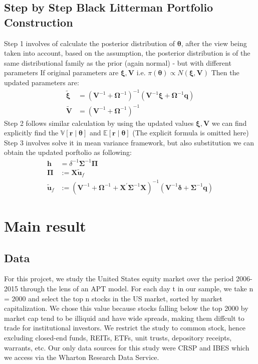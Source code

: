 \documentclass[12pt]{article}
\numberwithin{equation}{section}
\begin{document}
\subsection{Step by Step Black Litterman Portfolio Construction}
\indent
Step 1 involves of calculate the posterior distribution of $\boldsymbol{\theta}$, after the view being taken into account, based on the assumption, the posterior distribution is of the same distributional family as the prior (again normal) - but with different parameters
If original parameters are $\boldsymbol{\xi}, \textbf{V}$ i.e. $\pi(\boldsymbol{\theta}) \propto N(\boldsymbol{\xi},\textbf{V})$
Then the updated parameters are:
\begin{align} 
\tilde{{\boldsymbol{\xi}}} &= (\textbf{V}^{-1} + \boldsymbol{\Omega}^{-1})^{-1} (\textbf{V}^{-1}\boldsymbol{\xi} + \boldsymbol{\Omega}^{-1} \textbf{q}) \\
\tilde{\textbf{V}} &= (\textbf{V}^{-1} + \boldsymbol{\Omega}^{-1})^{-1}
\end{align}
Step 2 follows similar calculation by using the updated values $\boldsymbol{\xi}, \textbf{V}$ we can find explicitly find the $\mathbb{V}[\textbf{r}\mid\boldsymbol{\theta}]$ and $\mathbb{E}[\textbf{r}\mid\boldsymbol{\theta}] $ (The explicit formula is omitted here)
Step 3 involves solve it in mean variance framework, but also substitution we can obtain the updated porftolio as following:
\begin{align} 
\textbf{h} &= \delta^{-1} \boldsymbol{\Sigma}^{-1}  \boldsymbol{\Pi} \\
\boldsymbol{\Pi} & := \textbf{X}\tilde{\boldsymbol{u}}_f \\
\tilde{\boldsymbol{u}}_f & := (\textbf{V}^{-1}+ \boldsymbol{\Omega}^{-1}+\textbf{X}^{'}\boldsymbol{\Sigma}^{-1}\textbf{X})^{-1}(\textbf{V}^{-1}\boldsymbol{\delta} + \boldsymbol{\Sigma}^{-1}\textbf{q})
\end{align}

\section{Main result}
\subsection{Data}
For this projcet, we study the United States equity market over the period 2006-2015 through the lens of an APT model. For each day t in our sample, we take n = 2000 and select the top n stocks in the US market, sorted by market capitalization. We chose this value because stocks falling below the top 2000 by market cap tend to be illiquid and have wide spreads, making them diffcult to trade for institutional investors. We restrict the study to common stock, hence excluding closed-end funds, REITs, ETFs, unit trusts, depository receipts, warrants, etc. Our only data sources for this study were CRSP and IBES which we access via the Wharton Research Data Service. 
\end{document}
